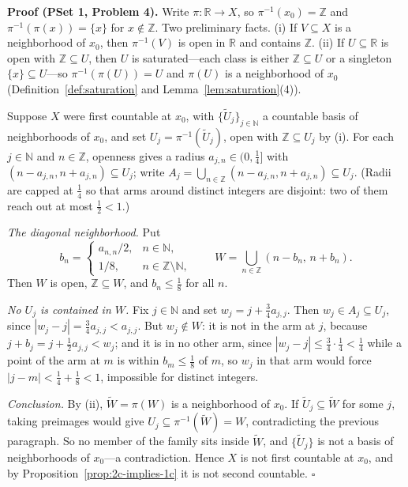 \documentclass[11pt]{report}
\renewenvironment{proof}[1][Proof]{\noindent\textbf{#1.} }{\hfill$\square$\par\vspace{5pt}}
\begin{document}
\begin{proof}[Proof (PSet 1, Problem 4)]
Write $\pi : \mathbb{R} \to X$, so $\pi^{-1}(x_0) = \mathbb{Z}$ and $\pi^{-1}(\pi(x)) = \{x\}$ for $x \notin \mathbb{Z}$. Two preliminary facts. (i) If $V \subseteq X$ is a neighborhood of $x_0$, then $\pi^{-1}(V)$ is open in $\mathbb{R}$ and contains $\mathbb{Z}$. (ii) If $U \subseteq \mathbb{R}$ is open with $\mathbb{Z} \subseteq U$, then $U$ is saturated---each class is either $\mathbb{Z} \subseteq U$ or a singleton $\{x\} \subseteq U$---so $\pi^{-1}(\pi(U)) = U$ and $\pi(U)$ is a neighborhood of $x_0$ (Definition~\ref{def:saturation} and Lemma~\ref{lem:saturation}(4)).

Suppose $X$ were first countable at $x_0$, with $\{\widetilde U_j\}_{j \in \mathbb{N}}$ a countable basis of neighborhoods of $x_0$, and set $U_j = \pi^{-1}(\widetilde U_j)$, open with $\mathbb{Z} \subseteq U_j$ by (i). For each $j \in \mathbb{N}$ and $n \in \mathbb{Z}$, openness gives a radius $a_{j,n} \in (0, \tfrac14]$ with $(n - a_{j,n}, n + a_{j,n}) \subseteq U_j$; write $A_j = \bigcup_{n \in \mathbb{Z}} (n - a_{j,n}, n + a_{j,n}) \subseteq U_j$. (Radii are capped at $\tfrac14$ so that arms around distinct integers are disjoint: two of them reach out at most $\tfrac12 < 1$.)

\emph{The diagonal neighborhood.} Put
\[
b_n = \begin{cases} a_{n,n}/2, & n \in \mathbb{N}, \\ 1/8, & n \in \mathbb{Z} \setminus \mathbb{N}, \end{cases}
\qquad W = \bigcup_{n \in \mathbb{Z}} (n - b_n,\, n + b_n).
\]
Then $W$ is open, $\mathbb{Z} \subseteq W$, and $b_n \le \tfrac18$ for all $n$.

\emph{No $U_j$ is contained in $W$.} Fix $j \in \mathbb{N}$ and set $w_j = j + \tfrac34 a_{j,j}$. Then $w_j \in A_j \subseteq U_j$, since $|w_j - j| = \tfrac34 a_{j,j} < a_{j,j}$. But $w_j \notin W$: it is not in the arm at $j$, because $j + b_j = j + \tfrac12 a_{j,j} < w_j$; and it is in no other arm, since $|w_j - j| \le \tfrac34 \cdot \tfrac14 < \tfrac14$ while a point of the arm at $m$ is within $b_m \le \tfrac18$ of $m$, so $w_j$ in that arm would force $|j - m| < \tfrac14 + \tfrac18 < 1$, impossible for distinct integers.

\emph{Conclusion.} By (ii), $\widetilde W = \pi(W)$ is a neighborhood of $x_0$. If $\widetilde U_j \subseteq \widetilde W$ for some $j$, taking preimages would give $U_j \subseteq \pi^{-1}(\widetilde W) = W$, contradicting the previous paragraph. So no member of the family sits inside $\widetilde W$, and $\{\widetilde U_j\}$ is not a basis of neighborhoods of $x_0$---a contradiction. Hence $X$ is not first countable at $x_0$, and by Proposition~\ref{prop:2c-implies-1c} it is not second countable.
\end{proof}
\end{document}
